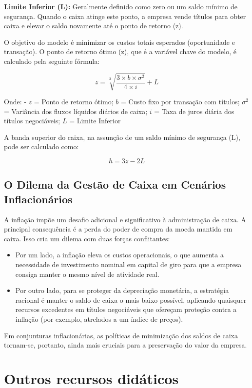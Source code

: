 \documentclass[
  a4paper,
]{book}
\begin{document}
\textbf{Limite Inferior (L):} Geralmente definido como zero ou um saldo
mínimo de segurança. Quando o caixa atinge este ponto, a empresa vende
títulos para obter caixa e elevar o saldo novamente até o ponto de
retorno (z).

O objetivo do modelo é minimizar os custos totais esperados
(oportunidade e transação). O ponto de retorno ótimo (z), que é a
variável chave do modelo, é calculado pela seguinte fórmula:

\[z = \sqrt[3]{\frac{3 \times b \times \sigma^2}{4 \times i}} + L\]

Onde: - \(z\) = Ponto de retorno ótimo; \(b\) = Custo fixo por transação
com títulos; \(\sigma^2\) = Variância dos fluxos líquidos diários de
caixa; \(i\) = Taxa de juros diária dos títulos negociáveis; \(L\) =
Limite Inferior

A banda superior do caixa, na assunção de um saldo mínimo de segurança
(L), pode ser calculado como:

\[h = 3z - 2L\]

\subsection{O Dilema da Gestão de Caixa em Cenários
Inflacionários}\label{o-dilema-da-gestuxe3o-de-caixa-em-cenuxe1rios-inflacionuxe1rios}

A inflação impõe um desafio adicional e significativo à administração de
caixa. A principal consequência é a perda do poder de compra da moeda
mantida em caixa. Isso cria um dilema com duas forças conflitantes:

\begin{itemize}
\item
  Por um lado, a inflação eleva os custos operacionais, o que aumenta a
  necessidade de investimento nominal em capital de giro para que a
  empresa consiga manter o mesmo nível de atividade real.
\item
  Por outro lado, para se proteger da depreciação monetária, a
  estratégia racional é manter o saldo de caixa o mais baixo possível,
  aplicando quaisquer recursos excedentes em títulos negociáveis que
  ofereçam proteção contra a inflação (por exemplo, atrelados a um
  índice de preços).
\end{itemize}

Em conjunturas inflacionárias, as políticas de minimização dos saldos de
caixa tornam-se, portanto, ainda mais cruciais para a preservação do
valor da empresa.

\section*{Outros recursos
didáticos}\label{outros-recursos-diduxe1ticos-2}
\end{document}
